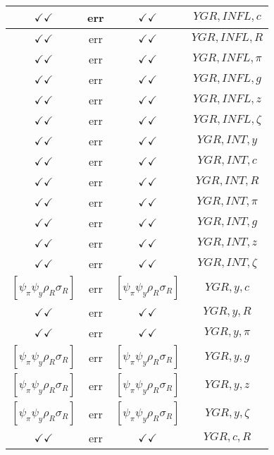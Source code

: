 \documentclass[a4paper,10pt]{article}
\begin{document}
\begin{longtable}{|c|c|c|c|}
\hline
$\checkmark\checkmark$ & err & $\checkmark\checkmark$ & ${YGR},{INFL},{c}$ \\
\hline
$\checkmark\checkmark$ & err & $\checkmark\checkmark$ & ${YGR},{INFL},{R}$ \\
\hline
$\checkmark\checkmark$ & err & $\checkmark\checkmark$ & ${YGR},{INFL},{\pi}$ \\
\hline
$\checkmark\checkmark$ & err & $\checkmark\checkmark$ & ${YGR},{INFL},{g}$ \\
\hline
$\checkmark\checkmark$ & err & $\checkmark\checkmark$ & ${YGR},{INFL},{z}$ \\
\hline
$\checkmark\checkmark$ & err & $\checkmark\checkmark$ & ${YGR},{INFL},{\zeta}$ \\
\hline
$\checkmark\checkmark$ & err & $\checkmark\checkmark$ & ${YGR},{INT},{y}$ \\
\hline
$\checkmark\checkmark$ & err & $\checkmark\checkmark$ & ${YGR},{INT},{c}$ \\
\hline
$\checkmark\checkmark$ & err & $\checkmark\checkmark$ & ${YGR},{INT},{R}$ \\
\hline
$\checkmark\checkmark$ & err & $\checkmark\checkmark$ & ${YGR},{INT},{\pi}$ \\
\hline
$\checkmark\checkmark$ & err & $\checkmark\checkmark$ & ${YGR},{INT},{g}$ \\
\hline
$\checkmark\checkmark$ & err & $\checkmark\checkmark$ & ${YGR},{INT},{z}$ \\
\hline
$\checkmark\checkmark$ & err & $\checkmark\checkmark$ & ${YGR},{INT},{\zeta}$ \\
\hline
$[\psi_\pi \psi_y \rho_R \sigma_R ]$ & err & $[\psi_\pi \psi_y \rho_R \sigma_R ]$ & ${YGR},{y},{c}$ \\
\hline
$\checkmark\checkmark$ & err & $\checkmark\checkmark$ & ${YGR},{y},{R}$ \\
\hline
$\checkmark\checkmark$ & err & $\checkmark\checkmark$ & ${YGR},{y},{\pi}$ \\
\hline
$[\psi_\pi \psi_y \rho_R \sigma_R ]$ & err & $[\psi_\pi \psi_y \rho_R \sigma_R ]$ & ${YGR},{y},{g}$ \\
\hline
$[\psi_\pi \psi_y \rho_R \sigma_R ]$ & err & $[\psi_\pi \psi_y \rho_R \sigma_R ]$ & ${YGR},{y},{z}$ \\
\hline
$[\psi_\pi \psi_y \rho_R \sigma_R ]$ & err & $[\psi_\pi \psi_y \rho_R \sigma_R ]$ & ${YGR},{y},{\zeta}$ \\
\hline
$\checkmark\checkmark$ & err & $\checkmark\checkmark$ & ${YGR},{c},{R}$ \\

\end{longtable}
\end{document}
